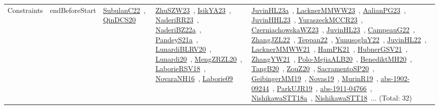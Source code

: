 {\begin{longtable}{lp{3cm}>{\raggedright\arraybackslash}p{6cm}>{\raggedright\arraybackslash}p{6cm}>{\raggedright\arraybackslash}p{8cm}}
Constraints & endBeforeStart & \href{../works/SubulanC22.pdf}{SubulanC22}~\cite{SubulanC22}, \href{../works/QinDCS20.pdf}{QinDCS20}~\cite{QinDCS20} & \href{../works/ZhuSZW23.pdf}{ZhuSZW23}~\cite{ZhuSZW23}, \href{../works/IsikYA23.pdf}{IsikYA23}~\cite{IsikYA23}, \href{../works/NaderiRR23.pdf}{NaderiRR23}~\cite{NaderiRR23}, \href{../works/NaderiBZ22a.pdf}{NaderiBZ22a}~\cite{NaderiBZ22a}, \href{../works/PandeyS21a.pdf}{PandeyS21a}~\cite{PandeyS21a}, \href{../works/LunardiBLRV20.pdf}{LunardiBLRV20}~\cite{LunardiBLRV20}, \href{../works/Lunardi20.pdf}{Lunardi20}~\cite{Lunardi20}, \href{../works/MengZRZL20.pdf}{MengZRZL20}~\cite{MengZRZL20}, \href{../works/LaborieRSV18.pdf}{LaborieRSV18}~\cite{LaborieRSV18}, \href{../works/NovaraNH16.pdf}{NovaraNH16}~\cite{NovaraNH16}, \href{../works/Laborie09.pdf}{Laborie09}~\cite{Laborie09} & \href{../works/JuvinHL23a.pdf}{JuvinHL23a}~\cite{JuvinHL23a}, \href{../works/LacknerMMWW23.pdf}{LacknerMMWW23}~\cite{LacknerMMWW23}, \href{../works/AalianPG23.pdf}{AalianPG23}~\cite{AalianPG23}, \href{../works/JuvinHHL23.pdf}{JuvinHHL23}~\cite{JuvinHHL23}, \href{../works/YuraszeckMCCR23.pdf}{YuraszeckMCCR23}~\cite{YuraszeckMCCR23}, \href{../works/CzerniachowskaWZ23.pdf}{CzerniachowskaWZ23}~\cite{CzerniachowskaWZ23}, \href{../works/JuvinHL23.pdf}{JuvinHL23}~\cite{JuvinHL23}, \href{../works/CampeauG22.pdf}{CampeauG22}~\cite{CampeauG22}, \href{../works/ZhangJZL22.pdf}{ZhangJZL22}~\cite{ZhangJZL22}, \href{../works/Teppan22.pdf}{Teppan22}~\cite{Teppan22}, \href{../works/YunusogluY22.pdf}{YunusogluY22}~\cite{YunusogluY22}, \href{../works/JuvinHL22.pdf}{JuvinHL22}~\cite{JuvinHL22}, \href{../works/LacknerMMWW21.pdf}{LacknerMMWW21}~\cite{LacknerMMWW21}, \href{../works/HamPK21.pdf}{HamPK21}~\cite{HamPK21}, \href{../works/HubnerGSV21.pdf}{HubnerGSV21}~\cite{HubnerGSV21}, \href{../works/ZhangYW21.pdf}{ZhangYW21}~\cite{ZhangYW21}, \href{../works/Polo-MejiaALB20.pdf}{Polo-MejiaALB20}~\cite{Polo-MejiaALB20}, \href{../works/BenediktMH20.pdf}{BenediktMH20}~\cite{BenediktMH20}, \href{../works/TangB20.pdf}{TangB20}~\cite{TangB20}, \href{../works/ZouZ20.pdf}{ZouZ20}~\cite{ZouZ20}, \href{../works/SacramentoSP20.pdf}{SacramentoSP20}~\cite{SacramentoSP20}, \href{../works/GeibingerMM19.pdf}{GeibingerMM19}~\cite{GeibingerMM19}, \href{../works/Novas19.pdf}{Novas19}~\cite{Novas19}, \href{../works/MurinR19.pdf}{MurinR19}~\cite{MurinR19}, \href{../works/abs-1902-09244.pdf}{abs-1902-09244}~\cite{abs-1902-09244}, \href{../works/ParkUJR19.pdf}{ParkUJR19}~\cite{ParkUJR19}, \href{../works/abs-1911-04766.pdf}{abs-1911-04766}~\cite{abs-1911-04766}, \href{../works/NishikawaSTT18a.pdf}{NishikawaSTT18a}~\cite{NishikawaSTT18a}, \href{../works/NishikawaSTT18.pdf}{NishikawaSTT18}~\cite{NishikawaSTT18}... (Total: 32)\\

\end{longtable}}
